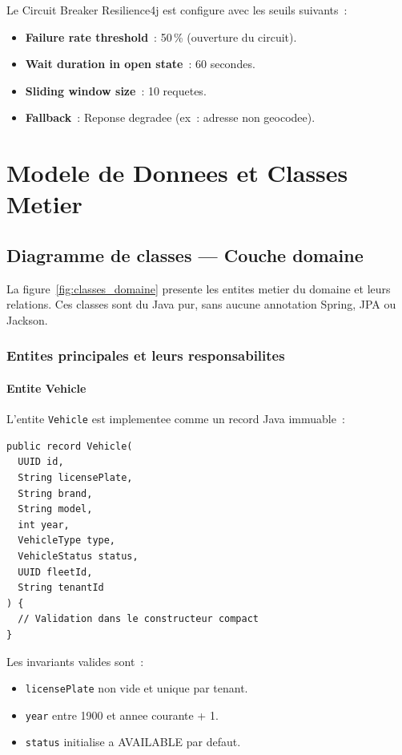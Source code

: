 \documentclass[12pt,a4paper]{report}
\begin{document}
Le Circuit Breaker Resilience4j est configure avec les seuils suivants~:
\begin{itemize}[leftmargin=2cm]
  \item \textbf{Failure rate threshold}~: 50\,\% (ouverture du circuit).
  \item \textbf{Wait duration in open state}~: 60 secondes.
  \item \textbf{Sliding window size}~: 10 requetes.
  \item \textbf{Fallback}~: Reponse degradee (ex~: adresse non geocodee).
\end{itemize}

\chapter{Modele de Donnees et Classes Metier}

\section{Diagramme de classes --- Couche domaine}

La figure~\ref{fig:classes_domaine} presente les entites metier
du domaine et leurs relations. Ces classes sont du Java pur,
sans aucune annotation Spring, JPA ou Jackson.

\subsection{Entites principales et leurs responsabilites}

\subsubsection{Entite Vehicle}

L'entite \texttt{Vehicle} est implementee comme un record Java immuable~:
\begin{verbatim}
public record Vehicle(
  UUID id,
  String licensePlate,
  String brand,
  String model,
  int year,
  VehicleType type,
  VehicleStatus status,
  UUID fleetId,
  String tenantId
) {
  // Validation dans le constructeur compact
}
\end{verbatim}

Les invariants valides sont~:
\begin{itemize}[leftmargin=2cm]
  \item \texttt{licensePlate} non vide et unique par tenant.
  \item \texttt{year} entre 1900 et annee courante + 1.
  \item \texttt{status} initialise a AVAILABLE par defaut.
\end{itemize}
\end{document}
